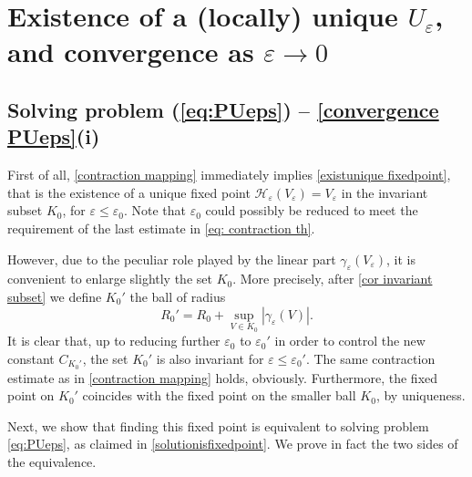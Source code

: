 \documentclass[10pt]{amsart}
\let\mathcal\mathscr
\theoremstyle{plain}
\theoremstyle{definition}
\renewcommand{\H}{\mathcal{H}_\eps}
\let\eps\varepsilon
\begin{document}
\section{Existence of a (locally) unique \texorpdfstring{$U_\eps$}{Ue}, and convergence as \texorpdfstring{$\eps\to 0$}{eo}}

\subsection{Solving problem (\ref{eq:PUeps}) -- \cref{convergence PUeps}(i)}
\label{sec proof reformulation}

First of all, \cref{contraction mapping} immediately implies \cref{existunique fixedpoint}, that is the existence of a unique fixed point $\H(V_\eps) = V_\eps$ in the invariant subset $K_0$, for $\eps \leq \eps_0$. Note that $\eps_0$ could possibly be reduced to meet the requirement of the last estimate in \eqref{eq: contraction th}.

However, due to the peculiar role played by the linear part $\gamma_\eps(V_\eps)$, it is convenient to enlarge slightly the set $K_0$. More precisely, after \cref{cor invariant subset} we define $K_0' $ the ball of radius
\begin{equation}\label{eq:R0'}
R_0' = R_0 + \sup_{V\in K_0}|\gamma_\eps(V)|.
\end{equation}
It is clear that, up to reducing further $\eps_0$ to $\eps_0'$ in order to control the new constant $C_{K_0'}$, the set $K_0'$ is also invariant for $\eps\leq \eps_0'$. The same contraction estimate as in \cref{contraction mapping} holds, obviously. Furthermore, the fixed point on $K_0'$ coincides with the fixed point on the smaller ball $K_0$, by uniqueness.

Next, we show that finding this fixed point is equivalent to solving problem \eqref{eq:PUeps}, as claimed in \cref{solutionisfixedpoint}. We prove in fact the two sides of the equivalence.
\end{document}
